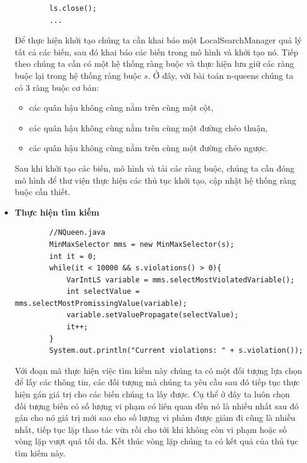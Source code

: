 \begin{itemize}
\begin{lstlisting}
		ls.close();		
		...
	\end{lstlisting}
	Để thực hiện khởi tạo chúng ta cần khai báo một \textsf{LocalSearchManager} quả lý tất cả các biến, sau đó khai báo các biến trong mô hình và khởi tạo nó. Tiếp theo chúng ta cần có một hệ thống ràng buộc và thực hiện lưu giữ các ràng buộc lại trong hệ thống ràng buộc $s$. Ở đây, với bài toán n-queens chúng ta có 3 ràng buộc cơ bản:
	\begin{itemize}
		\item các quân hậu không cùng nằm trên cùng một cột,
		\item các quân hậu không cùng nằm trên cùng một đường chéo thuận,
		\item các quân hậu không cùng nằm trên cùng một đường chéo ngược. 
	\end{itemize}
	Sau khi khởi tạo các biến, mô hình và tải các ràng buộc, chúng ta cần đóng mô hình để thư viện thực hiện các thủ tục khởi tạo, cập nhật hệ thống ràng buộc cần thiết.
	\item \textbf{Thực hiện tìm kiếm}
	\begin{lstlisting}
		//NQueen.java
		MinMaxSelector mms = new MinMaxSelector(s);
		int it = 0;
		while(it < 10000 && s.violations() > 0){
			VarIntLS variable = mms.selectMostViolatedVariable();
			int selectValue = mms.selectMostPromissingValue(variable);
			variable.setValuePropagate(selectValue);
			it++;
		}
		System.out.println("Current violations: " + s.violation());
	\end{lstlisting}
	Với đoạn mã thực hiện việc tìm kiếm này chúng ta có một đối tượng lựa chọn để lấy các thông tin, các đối tượng mà chúng ta yêu cầu sau đó tiếp tục thực hiện gán giá trị cho các biến chúng ta lấy được. Cụ thể ở đây ta luôn chọn đối tượng biến có số lượng vi phạm có liên quan đến nó là nhiều nhất sau đó gán cho nó giá trị mới sao cho số lượng vi phảm được giảm đi cũng là nhiều nhất, tiếp tục lặp thao tác vừa rồi cho tới khi không còn vi phạm hoặc số vòng lặp vượt quá tối đa. Kết thúc vòng lặp chúng ta có kết quả của thủ tục tìm kiếm này.
\end{itemize}



